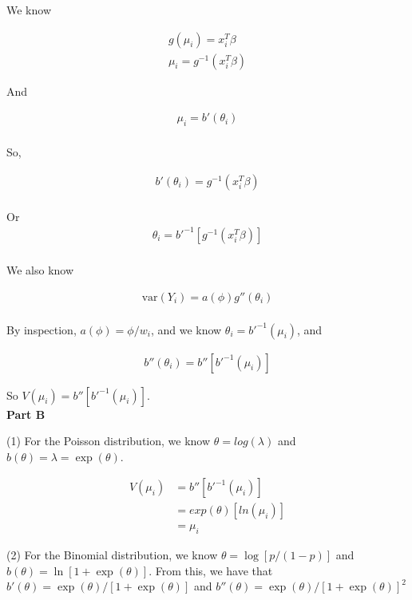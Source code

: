 \documentclass[12pt]{amsart}
\begin{document}
We know 

\begin{align*}
g(\mu_i) = x_i^T\beta\\
\mu_i = g^{-1}(x_i^T\beta) 
\end{align*}

And 

\begin{align*}
\mu_i = b'(\theta_i) \\ 
\end{align*}

So, 

\begin{align*}
  b'(\theta_i) = g^{-1}(x_i^T\beta)  \\ 
\end{align*}

Or 
\begin{align*}
  \theta_i= b'^{-1}[g^{-1}(x_i^T\beta)]  \\ 
\end{align*}


We also know

\begin{align*}
  \mbox{var}(Y_i)=a(\phi)g''(\theta_i)  \\ 
\end{align*}

By inspection, $a(\phi)=\phi/w_i$, and we know $\theta_i = b'^{-1}(\mu_i)$, and 

\begin{align*}
  b''(\theta_i)  = b''[b'^{-1}(\mu_i)]
\end{align*}

So $V(\mu_i)=b''[b'^{-1}(\mu_i)]$.\\

{\bf Part B} \\
\bigskip

(1) For the Poisson distribution, we know $\theta=log(\lambda)$ and $b(\theta)=\lambda=\exp(\theta)$.

\begin{align*}
    V(\mu_i)&=b''[b'^{-1}(\mu_i)]\\
    &=exp(\theta)[ln(\mu_i)]\\
    &= \mu_i
\end{align*}

(2) For the Binomial distribution, we know $\theta=\log[p/(1-p)]$ and $b(\theta)=\ln[1+\exp(\theta)]$. From this, we have that $b'(\theta)=\exp(\theta)/[1+\exp(\theta)]$ and $b''(\theta)=\exp(\theta)/[1+\exp(\theta)]^2$
\end{document}
